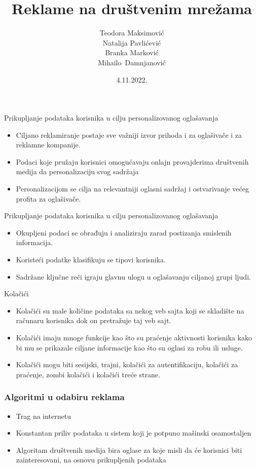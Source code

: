 \documentclass{beamer}
\title{Reklame na društvenim mrežama}
\author[Maksimović,Pavlićević,Marković,Damnjanović  ]{Teodora Maksimović\\Natalija Pavlićević\\
	Branka Marković\\Mihailo~Damnjanović}
\institute[]{Matematički fakultet, Univerzitet u Beogradu}
\date{4.11.2022.}
\begin{document}
	
	\frame{\titlepage}
	
	\begin{frame}{Prikupljanje podataka korisnika u cilju personalizovanog oglašavanja}
		\begin{itemize}
			\item Ciljano reklamiranje postaje sve važniji izvor prihoda i za oglašivače i za reklamne kompanije.
			\item Podaci koje pružaju korisnici omogućavaju onlajn provajderima društvenih medija da personalizaciju svog sadržaja
			\item Personalizacijom se cilja na relevantniji oglasni sadržaj i ostvarivanje većeg profita za oglašivače.
		\end{itemize}
	\end{frame}
	
	\begin{frame}{Prikupljanje podataka korisnika u cilju personalizovanog oglašavanja}
		\begin{itemize}
			\item Okupljeni podaci se obrađuju i analiziraju zarad postizanja smislenih informacija.
			\item Koristeći podatke klasifikuju se tipovi korisnika. \item Sadržane ključne reči igraju glavnu ulogu u oglašavanju ciljanoj grupi ljudi.
		\end{itemize}
		
	\end{frame}
	
	\begin{frame}{Kolačići}
		\begin{itemize}
			\item Kolačići su male količine podataka sa nekog veb sajta koji se skladište na računaru korisnika dok on pretražuje taj veb sajt.
			\item Kolačići imaju mnoge funkcije kao što su praćenje aktivnosti korisnika kako bi mu se prikazale ciljane informacije kao što su oglasi za robu ili usluge.
			\item Kolačići mogu biti sesijski, trajni, kolačići za autentifikaciju, kolačići za praćenje, zombi kolačići i kolačići treće strane.
		\end{itemize}
		
	\end{frame}
	
	\begin{frame}
		\frametitle{Algoritmi u odabiru reklama}
		\begin{itemize}
			\item Trag na internetu
			\item Konstantan priliv podataka u sistem koji je potpuno mašinski osamostaljen
			\item Algoritam društvenih medija bira oglase za koje misli da će korisnici biti zainteresovani, na osnovu prikupljenih podataka
		\end{itemize} 
	\end{frame}
	
\end{document}
